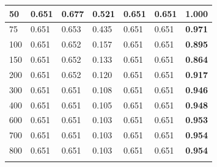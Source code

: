 \documentclass[letterpaper, 10 pt, conference]{ieeeconf}
\begin{document}
\begin{figure}[!h]
\begin{minipage}{\columnwidth}
{\begin{tabular}{lllllll}
\multicolumn{1}{|l|}{50} & \multicolumn{1}{l|}{0.651} & \multicolumn{1}{l|}{0.677} & \multicolumn{1}{l|}{0.521} & \multicolumn{1}{l|}{0.651} & \multicolumn{1}{l|}{0.651} & \multicolumn{1}{l|}{\textbf{1.000}} \\ \hline
\multicolumn{1}{|l|}{75} & \multicolumn{1}{l|}{0.651} & \multicolumn{1}{l|}{0.653} & \multicolumn{1}{l|}{0.435} & \multicolumn{1}{l|}{0.651} & \multicolumn{1}{l|}{0.651} & \multicolumn{1}{l|}{\textbf{0.971}} \\ \hline
\multicolumn{1}{|l|}{100} & \multicolumn{1}{l|}{0.651} & \multicolumn{1}{l|}{0.652} & \multicolumn{1}{l|}{0.157} & \multicolumn{1}{l|}{0.651} & \multicolumn{1}{l|}{0.651} & \multicolumn{1}{l|}{\textbf{0.895}} \\ \hline
\multicolumn{1}{|l|}{150} & \multicolumn{1}{l|}{0.651} & \multicolumn{1}{l|}{0.652} & \multicolumn{1}{l|}{0.133} & \multicolumn{1}{l|}{0.651} & \multicolumn{1}{l|}{0.651} & \multicolumn{1}{l|}{\textbf{0.864}} \\ \hline
\multicolumn{1}{|l|}{200} & \multicolumn{1}{l|}{0.651} & \multicolumn{1}{l|}{0.652} & \multicolumn{1}{l|}{0.120} & \multicolumn{1}{l|}{0.651} & \multicolumn{1}{l|}{0.651} & \multicolumn{1}{l|}{\textbf{0.917}} \\ \hline
\multicolumn{1}{|l|}{300} & \multicolumn{1}{l|}{0.651} & \multicolumn{1}{l|}{0.651} & \multicolumn{1}{l|}{0.108} & \multicolumn{1}{l|}{0.651} & \multicolumn{1}{l|}{0.651} & \multicolumn{1}{l|}{\textbf{0.946}} \\ \hline
\multicolumn{1}{|l|}{400} & \multicolumn{1}{l|}{0.651} & \multicolumn{1}{l|}{0.651} & \multicolumn{1}{l|}{0.105} & \multicolumn{1}{l|}{0.651} & \multicolumn{1}{l|}{0.651} & \multicolumn{1}{l|}{\textbf{0.948}} \\ \hline
\multicolumn{1}{|l|}{600} & \multicolumn{1}{l|}{0.651} & \multicolumn{1}{l|}{0.651} & \multicolumn{1}{l|}{0.103} & \multicolumn{1}{l|}{0.651} & \multicolumn{1}{l|}{0.651} & \multicolumn{1}{l|}{\textbf{0.953}} \\ \hline
\multicolumn{1}{|l|}{700} & \multicolumn{1}{l|}{0.651} & \multicolumn{1}{l|}{0.651} & \multicolumn{1}{l|}{0.103} & \multicolumn{1}{l|}{0.651} & \multicolumn{1}{l|}{0.651} & \multicolumn{1}{l|}{\textbf{0.954}} \\ \hline
\multicolumn{1}{|l|}{800} & \multicolumn{1}{l|}{0.651} & \multicolumn{1}{l|}{0.651} & \multicolumn{1}{l|}{0.103} & \multicolumn{1}{l|}{0.651} & \multicolumn{1}{l|}{0.651} & \multicolumn{1}{l|}{\textbf{0.954}} \\ \hline
\multicolumn{7}{|l|}{\cellcolor[HTML]{C0C0C0}} \\ \hline

\end{tabular}}
\end{minipage}
\end{figure}
\end{document}
